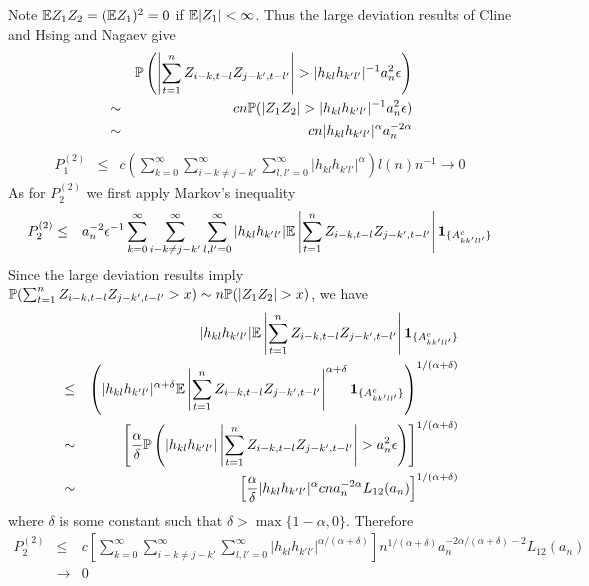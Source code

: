 \documentclass{article}
\begin{document}
Note $\mathbb{E} Z_1 Z_2 = (\mathbb{E} Z_1)^2 = 0$ if $\mathbb{E}|Z_1| < \infty$. Thus the
large deviation results of Cline and Hsing \cite{ClingHsing1998} and
Nagaev \cite{nagaev1979} give
\begin{eqnarray*}
  && \mathbb{P}\left(
    \left| \sum_{t=1}^n  Z_{i-k,t-l} Z_{j-k',t-l'}
    \right| > | h_{kl} h_{k'l'}|^{-1} a_n^2 \epsilon 
  \right) \\
  &\sim& c n \mathbb{P}(|Z_1 Z_2| > | h_{kl} h_{k'l'}|^{-1} a_n^2 \epsilon) \\
  &\sim& c n | h_{kl} h_{k'l'}|^{\alpha} a_n^{-2\alpha}
\end{eqnarray*}
\begin{eqnarray*}
  P^{(2)}_1 &\leq& c \left( \sum_{k=0}^\infty \sum_{i-k \neq j-k'}^\infty
  \sum_{l,l'=0}^\infty | h_{kl} h_{k'l'}|^{\alpha} \right) l(n) n^{-1}
\to 0
\end{eqnarray*}
As for $P^{(2)}_2$ we first apply Markov's inequality
\begin{eqnarray*}
  P^{(2)}_2 &\leq& a_n^{-2} \epsilon^{-1}
  \sum_{k=0}^\infty \sum_{i-k \neq j-k'}^\infty
  \sum_{l,l'=0}^\infty | h_{kl} h_{k'l'}| \mathbb{E} \left|
  \sum_{t=1}^n  Z_{i-k,t-l} Z_{j-k',t-l'} \right|
  \mathbf{1}_{\{A^c_{kk'll'}\}}
\end{eqnarray*}
Since the large deviation results imply $\mathbb{P}(\sum_{t=1}^n  Z_{i-k,t-l}
Z_{j-k',t-l'} > x) \sim n \mathbb{P}(|Z_1 Z_2| > x)$, we have
\begin{eqnarray*}
  && | h_{kl} h_{k'l'}| \mathbb{E} \left| \sum_{t=1}^n  Z_{i-k,t-l} Z_{j-k',t-l'} \right|
  \mathbf{1}_{\{A^c_{kk'll'}\}} \\
  &\leq& \left(
    | h_{kl} h_{k'l'}|^{\alpha + \delta} \mathbb{E} \left| \sum_{t=1}^n
      Z_{i-k,t-l} Z_{j-k',t-l'} \right|^{\alpha + \delta}
    \mathbf{1}_{\{A^c_{kk'll'}\}} \right)^{1/(\alpha + \delta)} \\
    &\sim& \left[
      {\alpha \over \delta} \mathbb{P}\left(
      | h_{kl} h_{k'l'}| \left| \sum_{t=1}^n  Z_{i-k,t-l} Z_{j-k',t-l'}
      \right| > a_n^2 \epsilon \right) \right]^{1/(\alpha + \delta)} \\
  &\sim& \left[
    {\alpha \over \delta} | h_{kl} h_{k'l'}|^{\alpha}
    c n a_n^{-2\alpha} L_{12}(a_n)
    \right]^{1/(\alpha + \delta)}
\end{eqnarray*}
where $\delta$ is some constant such that $\delta > \max\{1-\alpha,
0\}$. Therefore
\begin{eqnarray*}
  P^{(2)}_2 &\leq& c  \left[\sum_{k=0}^\infty \sum_{i-k \neq j-k'}^\infty
  \sum_{l,l'=0}^\infty |h_{kl} h_{k'l'}|^{\alpha/(\alpha + \delta)}\right]
  n^{1/(\alpha + \delta)} a_n^{-2\alpha/(\alpha + \delta )-2} L_{12}(a_n)\\
  &\to&  0
\end{eqnarray*}
\end{document}
